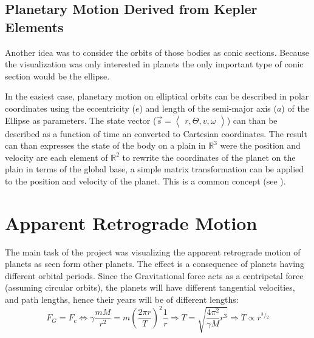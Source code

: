 \documentclass[a4paper,onesided,10pt]{article}
\begin{document}
\subsection{Planetary Motion Derived from Kepler Elements}
Another idea was to consider the orbits of those bodies as conic sections. Because the visualization was only interested in planets the only important type of conic section would be the ellipse.

In the easiest case, planetary motion on elliptical orbits can be described in polar coordinates using the eccentricity ($e$) and length of the semi-major axis ($a$) of the Ellipse as parameters. The state vector ($\vec{s} = \left\langle\begin{array}{c}r, \Theta, v, \omega \end{array}\right\rangle$) can than be described as a function of time an converted to Cartesian coordinates. The result can than expresses the state of the body on a plain in $\mathbb{R}^3$ were the position and velocity are each element of $\mathbb{R}^2$ to rewrite the coordinates of the planet on the plain in terms of the global base, a simple matrix transformation can be applied to the position and velocity of the planet. This is a common concept (see  \cite{KOECSV} \cite{KEAP}).


\section{Apparent Retrograde Motion}
The main task of the project was visualizing the apparent retrograde motion of planets as seen form other planets. The effect is a consequence of planets having different orbital periods. Since the Gravitational force acts as a centripetal force (assuming circular orbits), the planets will have different tangential velocities, and path lengths, hence their years will be of different lengths:
\begin{equation}
F_G = F_c \Leftrightarrow 
\gamma \frac{mM}{r^2} = m {\left( \frac{2 \pi r}{ T } \right)}^2 \frac{1}{r} \Rightarrow 
T = \sqrt{ \frac{4 \pi^2}{\gamma M} r^3 } \Rightarrow 
T \propto r^{ {}^3 / {}_2 }
\label{eq:TangentialVelocities}
\end{equation}
\end{document}
